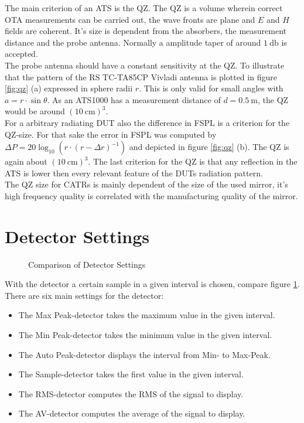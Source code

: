The main criterion of an \ac{ATS} is the \ac{QZ}. The \ac{QZ} is a volume wherein correct \ac{OTA} measurements can be carried out, the wave fronts are plane and $E$ and $H$ fields are coherent. It's size is dependent from the absorbers, the measurement distance and the probe antenna. Normally a amplitude taper of around $\SI{1}{\decibel}$ is accepted.\\
The probe antenna should have a constant sensitivity at the \ac{QZ}. To illustrate that the pattern of the \ac{RS} TC-TA85CP Vivladi antenna is plotted in figure \ref{fig:qz} (a) expressed in sphere radii $r$. This is only valid for small angles with $a=r\cdot\sin \theta$. As an ATS1000 has a measurement distance of $d = \SI{0.5}{\meter}$, the \ac{QZ} would be around $\left(\SI{10}{\centi\meter}\right)^3$.\\
For a arbitrary radiating \ac{DUT} also the difference in \ac{FSPL} is a criterion for the \ac{QZ}-size. For that sake the error in \ac{FSPL} was computed by $\Delta P = 20\log_{10}\left(r\cdot\left(r-\Delta r\right)^{-1}\right)$ and depicted in figure \ref{fig:qz} (b). The \ac{QZ} is again about $\left(\SI{10}{\centi\meter}\right)^3$. The last criterion for the \ac{QZ} is that any reflection in the \ac{ATS} is lower then every relevant feature of the \ac{DUT}s radiation pattern.\cite{ach}\\
The \ac{QZ} size for \acp{CATR} is mainly dependent of the size of the used mirror, it's high frequency quality is correlated with the manufacturing quality of the mirror.

\section{Detector Settings}

\begin{figure}[h]
\centering
\def\svgwidth{0.7\textwidth}

\caption{Comparison of Detector Settings \cite{funsspec}}
\label{fig:detset}
\end{figure}

With the detector a certain sample in a given interval is chosen, compare figure \ref{fig:detset}. There are six main settings for the detector: \cite{funsspec}
\begin{itemize}
\item The \textcolor[RGB]{237,28,36}{Max Peak-detector} takes the maximum value in the given interval.
\item The \textcolor[RGB]{0,166,88}{Min Peak-detector} takes the minimum value in the given interval.
\item The \textcolor[RGB]{0,94,138}{Auto Peak-detector} displays the interval from Min- to Max-Peak.
\item The \textcolor[RGB]{0,173,239}{Sample-detector} takes the first value in the given interval.
\item The \textcolor[RGB]{246,135,18}{RMS-detector} computes the \ac{RMS} of the signal to display.
\item The \textcolor[RGB]{114,100,184}{AV-detector} computes the average of the signal to display.
\end{itemize}

